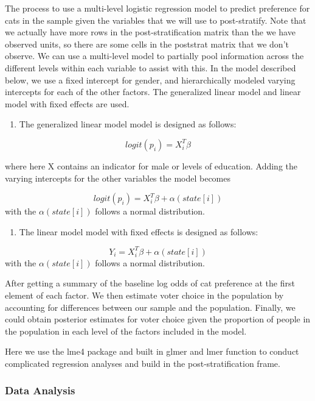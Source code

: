 \documentclass[
]{article}
\providecommand{\tightlist}{%
  \setlength{\itemsep}{0pt}\setlength{\parskip}{0pt}}
\begin{document}
The process to use a multi-level logistic regression model to predict
preference for cats in the sample given the variables that we will use
to post-stratify. Note that we actually have more rows in the
post-stratification matrix than the we have observed units, so there are
some cells in the poststrat matrix that we don't observe. We can use a
multi-level model to partially pool information across the different
levels within each variable to assist with this. In the model described
below, we use a fixed intercept for gender, and hierarchically modeled
varying intercepts for each of the other factors. The generalized linear
model and linear model with fixed effects are used.

\begin{enumerate}
\def\labelenumi{\arabic{enumi}.}
\tightlist
\item
  The generalized linear model model is designed as follows:
\end{enumerate}

\[logit(p_i) = X_i^T \beta\]

where here X contains an indicator for male or levels of education.
Adding the varying intercepts for the other variables the model becomes

\[logit(p_i) = X_i^T \beta + \alpha(state[i])\] with the
\(\alpha(state[i])\) follows a normal distribution.

\begin{enumerate}
\def\labelenumi{\arabic{enumi}.}
\setcounter{enumi}{1}
\tightlist
\item
  The linear model model with fixed effects is designed as follows:
\end{enumerate}

\[Y_i = X_i^T \beta + \alpha(state[i])\] with the \(\alpha(state[i])\)
follows a normal distribution.

After getting a summary of the baseline log odds of cat preference at
the first element of each factor. We then estimate voter choice in the
population by accounting for differences between our sample and the
population. Finally, we could obtain posterior estimates for voter
choice given the proportion of people in the population in each level of
the factors included in the model.

Here we use the lme4 package and built in glmer and lmer function to
conduct complicated regression analyses and build in the
post-stratification frame.

\hypertarget{data-analysis}{%
\subsubsection{Data Analysis}\label{data-analysis}}
\end{document}
